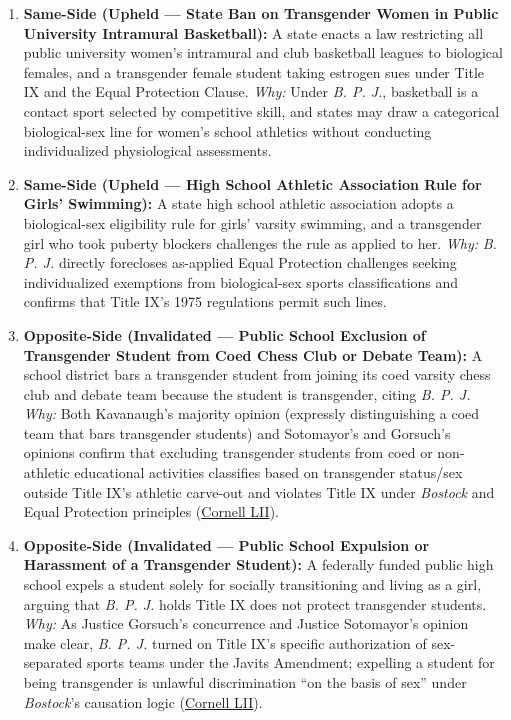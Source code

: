 \documentclass[12pt]{article}
\begin{document}
\begin{enumerate}
\item \textbf{Same-Side (Upheld --- State Ban on Transgender Women in Public University Intramural Basketball):} A state enacts a law restricting all public university women's intramural and club basketball leagues to biological females, and a transgender female student taking estrogen sues under Title IX and the Equal Protection Clause. \emph{Why:} Under \textit{B. P. J.}, basketball is a contact sport selected by competitive skill, and states may draw a categorical biological-sex line for women's school athletics without conducting individualized physiological assessments.

\item \textbf{Same-Side (Upheld --- High School Athletic Association Rule for Girls' Swimming):} A state high school athletic association adopts a biological-sex eligibility rule for girls' varsity swimming, and a transgender girl who took puberty blockers challenges the rule as applied to her. \emph{Why:} \textit{B. P. J.} directly forecloses as-applied Equal Protection challenges seeking individualized exemptions from biological-sex sports classifications and confirms that Title IX's 1975 regulations permit such lines.

\item \textbf{Opposite-Side (Invalidated --- Public School Exclusion of Transgender Student from Coed Chess Club or Debate Team):} A school district bars a transgender student from joining its coed varsity chess club and debate team because the student is transgender, citing \textit{B. P. J.} \emph{Why:} Both Kavanaugh's majority opinion (expressly distinguishing a coed team that bars transgender students) and Sotomayor's and Gorsuch's opinions confirm that excluding transgender students from coed or non-athletic educational activities classifies based on transgender status/sex outside Title IX's athletic carve-out and violates Title IX under \textit{Bostock} and Equal Protection principles (\href{https://www.law.cornell.edu/supremecourt/text/24-43}{Cornell LII}).

\item \textbf{Opposite-Side (Invalidated --- Public School Expulsion or Harassment of a Transgender Student):} A federally funded public high school expels a student solely for socially transitioning and living as a girl, arguing that \textit{B. P. J.} holds Title IX does not protect transgender students. \emph{Why:} As Justice Gorsuch's concurrence and Justice Sotomayor's opinion make clear, \textit{B. P. J.} turned on Title IX's specific authorization of sex-separated sports teams under the Javits Amendment; expelling a student for being transgender is unlawful discrimination ``on the basis of sex'' under \textit{Bostock}'s causation logic (\href{https://www.law.cornell.edu/supremecourt/text/24-43}{Cornell LII}).


\end{enumerate}
\end{document}
